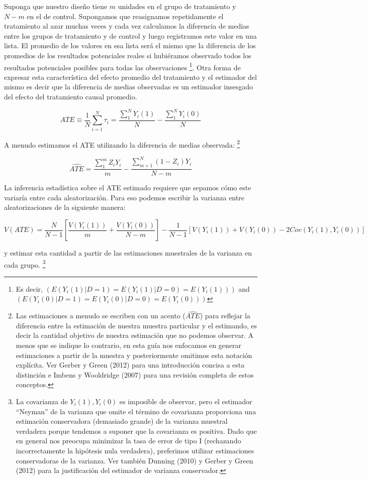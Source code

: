 \documentclass[
]{article}
\begin{document}
Suponga que nuestro diseño tiene \(m\) unidades en el grupo de
tratamiento y \(N - m\) en el de control. Supongamos que reasignamos
repetidamente el tratamiento al azar muchas veces y cada vez calculamos
la diferencia de medias entre los grupos de tratamiento y de control y
luego registramos este valor en una lista. El promedio de los valores en
esa lista será el mismo que la diferencia de los promedios de los
resultados potenciales reales si hubiéramos observado todos los
resultados potenciales posibles para todas las observaciones
\footnote{Es decir, \((E(Y_i(1)|D=1)=E(Y_i(1)|D=0)=E(Y_i(1)))\) and
  \((E(Y_i(0)|D=1)=E(Y_i(0)|D=0)=E(Y_i(0)))\)}. Otra forma de expresar
esta característica del efecto promedio del tratamiento y el estimador
del mismo es decir que la diferencia de medias observadas es un
estimador insesgado del efecto del tratamiento causal promedio.

\[ATE\equiv\frac{1}{N}\sum^{N}_{i=1}\tau_{i}=\frac{\sum^{N}_{1}Y_{i}(1)}{N}-\frac{\sum^{N}_{1}Y_{i}(0)}{N}\]

A menudo estimamos el ATE utilizando la diferencia de medias observada:
\footnote{Las estimaciones a menudo se escriben con un acento
  (\(\widehat {ATE}\)) para reflejar la diferencia entre la estimación
  de nuestra muestra particular y el estimando, es decir la cantidad
  objetivo de nuestra estimación que no podemos observar. A menos que se
  indique lo contrario, en esta guía nos enfocamos en generar
  estimaciones a partir de la muestra y posteriormente omitimos esta
  notación explícita. Ver Gerber y Green (2012) para una introducción
  concisa a esta distinción e Imbens y Wooldridge (2007) para una
  revisión completa de estos conceptos.}

\[\widehat{ATE} =\frac{\sum^m_1Z_{i}Y_{i}}{m}-\frac{\sum^{N}_{m+1}(1-Z_{i})Y_{i}}{N-m}\]

La inferencia estadística sobre el ATE estimado requiere que sepamos
cómo este variaría entre cada aleatorización. Para eso podemos escribir
la varianza entre aleatorizaciones de la siguiente manera:

\[V(ATE) = \frac{N}{N-1} [\frac{V(Y_{i}(1))}{m}+\frac{V(Y_{i}(0))}{N-m}]-\frac{1}{N-1}[V(Y_{i}(1))+V(Y_{i}(0))-2Cov(Y_{i}(1),Y_{i}(0))]\]

y estimar esta cantidad a partir de las estimaciones muestrales de la
varianza en cada grupo. \footnote{La covarianza de
  \(Y_{i} (1), Y_ {i} (0)\) es imposible de observar, pero el estimador
  ``Neyman'' de la varianza que omite el término de covarianza
  proporciona una estimación conservadora (demasiado grande) de la
  varianza muestral verdadera porque tendemos a suponer que la
  covarianza es positiva. Dado que en general nos preocupa minimizar la
  tasa de error de tipo I (rechazando incorrectamente la hipótesis nula
  verdadera), preferimos utilizar estimaciones conservadoras de la
  varianza. Ver también Dunning (2010) y Gerber y Green (2012) para la
  justificación del estimador de varianza conservador.}
\end{document}
